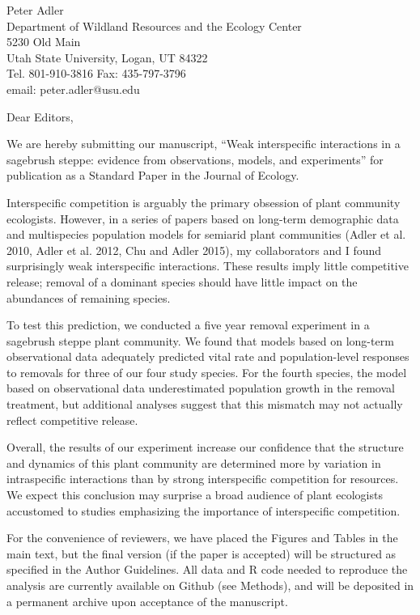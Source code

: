 \documentclass[11pt]{letter}
\begin{document}
Peter Adler\\
 Department of Wildland Resources and the Ecology Center\\
 5230 Old Main\\
 Utah State University, Logan, UT 84322\\
 Tel. 801-910-3816 \quad Fax:  435-797-3796\\
 email: peter.adler@usu.edu
 
 \medskip

Dear Editors,

We are hereby submitting our manuscript, ``Weak interspecific interactions in a sagebrush steppe: evidence from observations, models, and experiments''
for publication as a Standard Paper in the Journal of Ecology.

Interspecific competition is arguably the primary obsession of plant community ecologists. However, in a series of papers based on long-term demographic data and multispecies population models for semiarid plant communities (Adler et al. 2010, Adler et al. 2012, Chu and Adler 2015), my collaborators and I found surprisingly weak interspecific interactions. These results imply little competitive release; removal of a dominant species should have little impact on the abundances of remaining species.

To test this prediction, we conducted a five year removal experiment in a sagebrush steppe plant community. We found that models based on long-term observational data adequately 
predicted vital rate and population-level responses to removals for three of our four study species. For the fourth species, the model based on observational data underestimated population growth in the removal treatment, but additional analyses suggest that this mismatch may not actually reflect competitive release. 
 
Overall, the results of our experiment increase our confidence that the structure and dynamics of this plant community are determined more by variation in intraspecific interactions than by strong interspecific competition for resources. We expect this conclusion may surprise a broad audience of plant ecologists accustomed to studies emphasizing the importance of interspecific competition.

For the convenience of reviewers, we have placed the Figures and Tables in the main text, but the final 
version (if the paper is accepted) will be structured as specified in the Author Guidelines. All data and R code needed
to reproduce the analysis are currently 
available on Github (see Methods), and will be deposited in a permanent archive upon acceptance of the manuscript.
\end{document}
